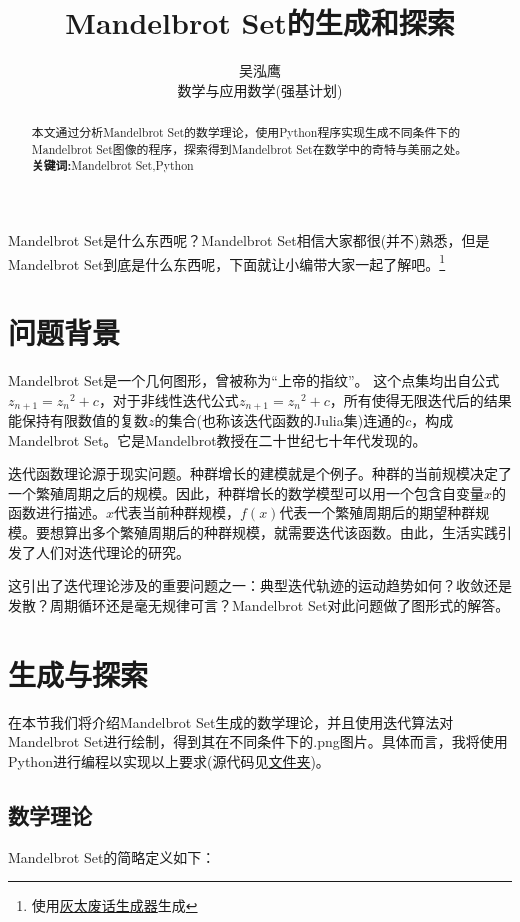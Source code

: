 \documentclass[a4paper]{ctexart}
\author{吴泓鹰\\数学与应用数学(强基计划)\quad3210101890}
\title{Mandelbrot Set的生成和探索}
\begin{document}
\maketitle	

\begin{abstract}
	本文通过分析Mandelbrot Set的数学理论，使用Python程序实现生成不同条件下的Mandelbrot Set图像的程序，探索得到Mandelbrot Set在数学中的奇特与美丽之处。\\
	\textbf{关键词:}Mandelbrot Set,Python
\end{abstract}	

Mandelbrot Set是什么东西呢？Mandelbrot Set相信大家都很(并不)熟悉，但是Mandelbrot Set到底是什么东西呢，下面就让小编带大家一起了解吧。\footnote{使用\href{https://www.pslkzs.com/feihua/feihua.php}{灰太废话生成器}生成}

\section{问题背景}
Mandelbrot Set是一个几何图形，曾被称为“上帝的指纹”。 这个点集均出自公式$z_{n+1}={z_n}^2+c$，对于非线性迭代公式$z_{n+1}={z_n}^2+c$，所有使得无限迭代后的结果能保持有限数值的复数$z$的集合(也称该迭代函数的Julia集)连通的$c$，构成Mandelbrot Set。它是Mandelbrot教授在二十世纪七十年代发现的。\cite{mandelbrotsetbaidu}

迭代函数理论源于现实问题。种群增长的建模就是个例子。种群的当前规模决定了一个繁殖周期之后的规模。因此，种群增长的数学模型可以用一个包含自变量$x$的函数进行描述。$x$代表当前种群规模，$f(x)$代表一个繁殖周期后的期望种群规模。要想算出多个繁殖周期后的种群规模，就需要迭代该函数。由此，生活实践引发了人们对迭代理论的研究。

这引出了迭代理论涉及的重要问题之一：典型迭代轨迹的运动趋势如何？收敛还是发散？周期循环还是毫无规律可言？Mandelbrot Set对此问题做了图形式的解答。\cite{mandelbrotsetzhihu}

\section{生成与探索}
在本节我们将介绍Mandelbrot Set生成的数学理论，并且使用迭代算法对Mandelbrot Set进行绘制，得到其在不同条件下的.png图片。具体而言，我将使用Python进行编程以实现以上要求(源代码见\href{run:./src/py/}{文件夹})\cite{mandelbrotsetpython}。

\subsection{数学理论}
Mandelbrot Set的简略定义如下：
\end{document}
